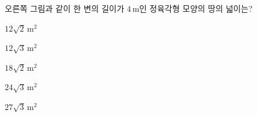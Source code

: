\noindent\begin{minipage}[t]{0.58\linewidth}\vspace{0pt}\raggedright 오른쪽 그림과 같이 한 변의 길이가 $4\,\mathrm{m}$인 정육각형 모양의 땅의 넓이는?\end{minipage}\hfill\begin{minipage}[t]{0.4\linewidth}\vspace{0pt}\centering \resizebox{\ifdim\width>\linewidth\linewidth\else\width\fi}{!}{}\end{minipage}\par
\begin{choicesii}{\rule[-3ex]{0pt}{8ex}$12\sqrt{2}\,\mathrm{m}^2$}{\rule[-3ex]{0pt}{8ex}$12\sqrt{3}\,\mathrm{m}^2$}{\rule[-3ex]{0pt}{8ex}$18\sqrt{2}\,\mathrm{m}^2$}{\rule[-3ex]{0pt}{8ex}$24\sqrt{3}\,\mathrm{m}^2$}{\rule[-3ex]{0pt}{8ex}$27\sqrt{3}\,\mathrm{m}^2$}\end{choicesii}
